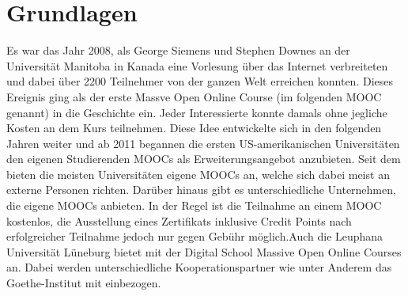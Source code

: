 \section{Grundlagen} %
\label{sec:grundlagen}
Es war das Jahr 2008, als George Siemens und Stephen Downes an der Universität Manitoba in Kanada eine Vorlesung über das Internet verbreiteten und dabei über 2200 Teilnehmer von der ganzen Welt erreichen konnten. Dieses Ereignis ging als der erste Massve Open Online Course (im folgenden MOOC genannt) in die Geschichte ein. Jeder Interessierte konnte damals ohne jegliche Kosten an dem Kurs teilnehmen. Diese Idee entwickelte sich in den folgenden Jahren weiter und ab 2011 begannen die ersten US-amerikanischen Universitäten den eigenen Studierenden MOOCs als Erweiterungsangebot anzubieten. Seit dem bieten die meisten Universitäten eigene MOOCs an, welche sich dabei meist an externe Personen richten. Darüber hinaus gibt es unterschiedliche Unternehmen, die eigene MOOCs anbieten. In der Regel ist die Teilnahme an einem MOOC kostenlos, die Ausstellung eines Zertifikats inklusive Credit Points nach erfolgreicher Teilnahme jedoch nur gegen Gebühr möglich.\newline Auch die Leuphana Universität Lüneburg bietet mit der Digital School Massive Open Online Courses an. Dabei werden unterschiedliche Kooperationspartner wie unter Anderem das Goethe-Institut mit einbezogen.



